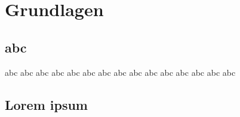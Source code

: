 
\chapter{Grundlagen}
\section{abc}
abc abc abc
abc abc abc
abc abc abc
abc abc abc
abc abc abc

\section{Lorem ipsum}

\begin{figure}
\centering
{}
\end{figure}

\lipsum

